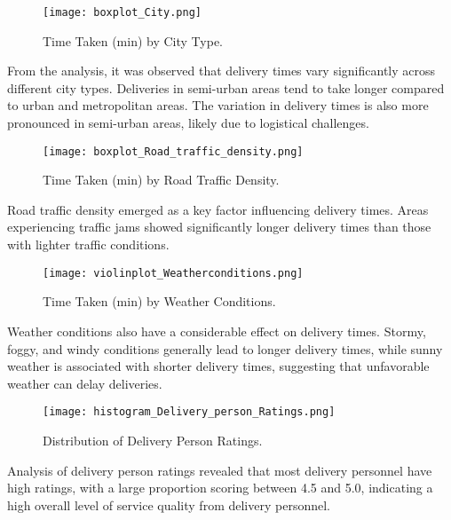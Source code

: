 \documentclass[10pt,twocolumn,letterpaper]{article}
\begin{document}
        \begin{figure}[ht]
            \centering
            \texttt{[image: boxplot\_City.png]}
            \caption{Time Taken (min) by City Type.}
            \label{fig:city_type}
        \end{figure}

        From the analysis, it was observed that delivery times vary significantly across different city types. Deliveries in semi-urban areas tend to take longer compared to urban and metropolitan areas. The variation in delivery times is also more pronounced in semi-urban areas, likely due to logistical challenges.

        \begin{figure}[ht]
            \centering
            \texttt{[image: boxplot\_Road\_traffic\_density.png]}
            \caption{Time Taken (min) by Road Traffic Density.}
            \label{fig:traffic_density}
        \end{figure}

        Road traffic density emerged as a key factor influencing delivery times. Areas experiencing traffic jams showed significantly longer delivery times than those with lighter traffic conditions.

        \begin{figure}[ht]
            \centering
            \texttt{[image: violinplot\_Weatherconditions.png]}
            \caption{Time Taken (min) by Weather Conditions.}
            \label{fig:weather_conditions}
        \end{figure}

        Weather conditions also have a considerable effect on delivery times. Stormy, foggy, and windy conditions generally lead to longer delivery times, while sunny weather is associated with shorter delivery times, suggesting that unfavorable weather can delay deliveries.

        \begin{figure}[ht]
            \centering
            \texttt{[image: histogram\_Delivery\_person\_Ratings.png]}
            \caption{Distribution of Delivery Person Ratings.}
            \label{fig:delivery_ratings}
        \end{figure}

        Analysis of delivery person ratings revealed that most delivery personnel have high ratings, with a large proportion scoring between 4.5 and 5.0, indicating a high overall level of service quality from delivery personnel.
\end{document}
